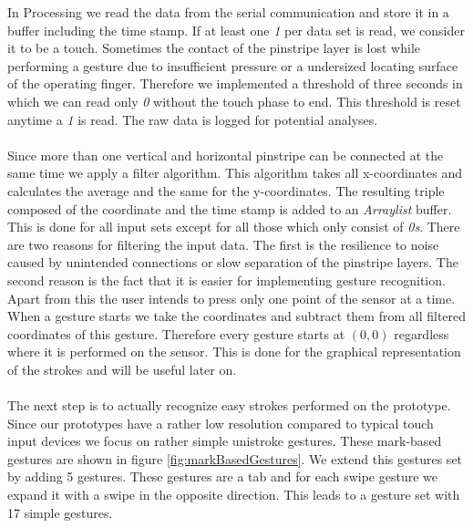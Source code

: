 In Processing we read the data from the serial communication and store it in a buffer including the time stamp.  If at least one \emph{1} per data set is read, we consider it to be a touch. Sometimes the contact of the pinstripe layer is lost while performing a gesture due to insufficient pressure or a undersized locating surface of the operating finger. Therefore we implemented a threshold of three seconds in which we can read only \emph{0} without the touch phase to end. This threshold is reset anytime a \emph{1} is read. The raw data is logged for potential analyses. \\ \\
Since more than one vertical and horizontal pinstripe can be connected at the same time we apply a filter algorithm. This algorithm takes all x-coordinates and calculates the average and the same for the y-coordinates. The resulting triple composed of the coordinate and the time stamp is added to an \emph{Arraylist} buffer. This is done for all input sets except for all those which only consist of \emph{0s}. There are two reasons for filtering the input data. The first is the resilience to noise caused by unintended connections or slow separation of the pinstripe layers. The second reason is the fact that it is easier for implementing gesture recognition. Apart from this the user intends to press only one point of the sensor at a time.
\\
When a gesture starts we take the coordinates and subtract them from all filtered coordinates of this gesture. Therefore every gesture starts at $(0,0)$ regardless where it is performed on the sensor. This is done for the graphical representation of the strokes and will be useful later on.
\\ \\
The next step is to actually recognize easy strokes performed on the prototype.  Since our prototypes have a rather low resolution compared to typical touch input devices we focus on rather simple unistroke gestures. These mark-based gestures are shown in figure \ref{fig:markBasedGestures}. We extend this gestures set by adding 5 gestures. These gestures are a tab and for each swipe gesture we expand it with a swipe in the opposite direction. This leads to a gesture set with 17 simple gestures. \\
